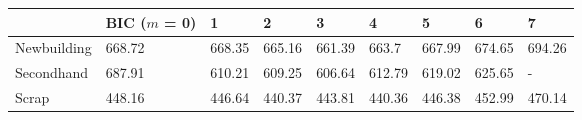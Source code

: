 
\begin{tabular}[t]{lllllllll}
\toprule
  & BIC ($m$ = 0) & 1 & 2 & 3 & 4 & 5 & 6 & 7\\
\midrule
Newbuilding & 668.72 & 668.35 & 665.16 & 661.39 & 663.7 & 667.99 & 674.65 & 694.26\\
Secondhand & 687.91 & 610.21 & 609.25 & 606.64 & 612.79 & 619.02 & 625.65 & -\\
Scrap & 448.16 & 446.64 & 440.37 & 443.81 & 440.36 & 446.38 & 452.99 & 470.14\\
\bottomrule
\end{tabular}
